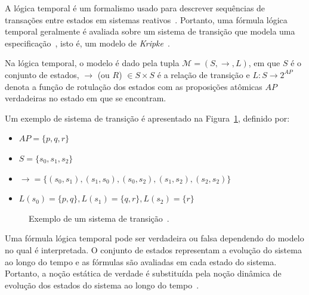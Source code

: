 A lógica temporal é um formalismo usado para descrever sequências de transações entre estados em sistemas reativos~\cite{clarke1999model}. Portanto, uma fórmula lógica temporal geralmente é avaliada sobre um sistema de transição que modela uma especificação~\cite{clarke1999model}, isto é, um modelo de \textit{Kripke}~\cite{kripke1959completeness}.

Na lógica temporal, o modelo é dado pela tupla $\mathcal{M} = (S, \rightarrow, L)$, em que $S$ é o conjunto de estados, $\rightarrow$ (ou $R$) $ \in S \times S$ é a relação de transição e $L \colon S \rightarrow 2^{AP}$ denota a função de rotulação dos estados com as proposições atômicas $AP$ verdadeiras no estado em que se encontram. 

Um exemplo de sistema de transição é apresentado na Figura~\ref{fig:temporal_grafo}, definido por:
\begin{itemize}
	\item $AP = \{p,q,r\}$
	\item $S = \{s_{0}, s_{1}, s_{2}\}$
	\item $\rightarrow = \{(s_{0}, s_{1}), (s_{1}, s_{0}), (s_{0}, s_{2}), (s_{1}, s_{2}), (s_{2}, s_{2})\}$
	\item $L(s_{0}) = \{p,q\}, L(s_{1}) = \{q, r\}, L(s_{2}) = \{r\}$
\end{itemize}

\begin{figure}[ht]
	\centering
{}
\caption{Exemplo de um sistema de transição~\cite{huth2004logic}.
	\label{fig:temporal_grafo}}
\end{figure}
\FloatBarrier

Uma fórmula lógica temporal pode ser verdadeira ou falsa dependendo do modelo no qual é interpretada. O conjunto de estados representam a evolução do sistema ao longo do tempo e as fórmulas são avaliadas em cada estado do sistema. Portanto, a noção estática de verdade é substituída pela noção dinâmica de evolução dos estados do sistema ao longo do tempo~\cite{clarke1999model}.


